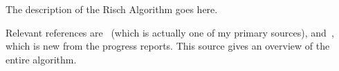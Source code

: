 The description of the Risch Algorithm goes here.

Relevant references are~\cite{bronstein2005symbolic} (which is actually
one of my primary sources), and~\cite{bronstein1998symbolic}, which is
new from the progress reports.  This source gives an overview of the
entire algorithm.  